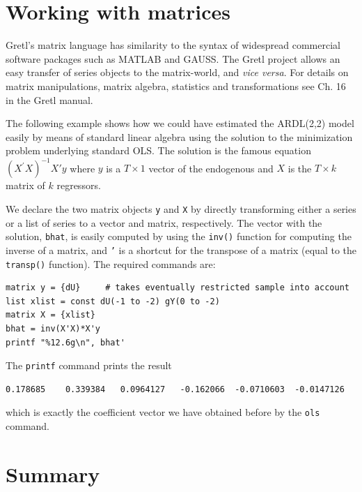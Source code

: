\documentclass[11pt]{article}
\begin{document}
\section{Working with matrices}
Gretl's matrix language has similarity to the syntax of widespread commercial software packages such as MATLAB and GAUSS. The Gretl project allows an easy transfer of series objects to the matrix-world, and \textit{vice versa}. For details on matrix manipulations, matrix algebra, statistics and transformations see Ch. 16 in the Gretl manual.

The following example shows how we could have estimated the ARDL(2,2) model easily by means of standard linear algebra using the solution to the minimization problem underlying standard OLS. The solution is the famous equation $ (X^\prime X)^{-1} X'y $ where $ y $  is a $ T \times 1 $ vector of the endogenous and $ X $ is the $ T \times k $ matrix of $ k $ regressors.

We declare the two matrix objects \texttt{y} and \texttt{X} by directly transforming either a series or a list of series to a vector and matrix, respectively. The vector with the solution, \texttt{bhat}, is easily computed by using the \texttt{inv()} function for computing the inverse of a matrix, and \texttt{'} is a shortcut for the transpose of a matrix (equal to the \texttt{transp()} function). The required commands are:
\begin{Verbatim}[baselinestretch=0.75, fontsize=\small]
matrix y = {dU}     # takes eventually restricted sample into account
list xlist = const dU(-1 to -2) gY(0 to -2)
matrix X = {xlist}
bhat = inv(X'X)*X'y
printf "%12.6g\n", bhat'
\end{Verbatim}
The \texttt{printf} command prints the result
\begin{Verbatim}[baselinestretch=0.75, fontsize=\small]
    0.178685    0.339384   0.0964127   -0.162066  -0.0710603  -0.0147126
\end{Verbatim}
which is exactly the coefficient vector we have obtained before by the \texttt{ols} command.


\section{Summary}





\end{document}
